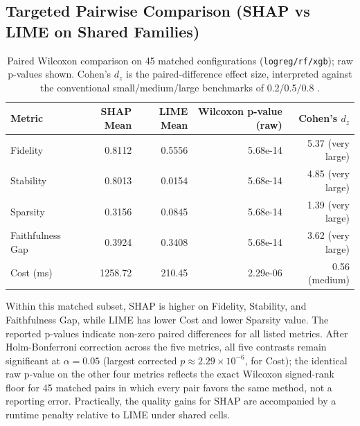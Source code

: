 \documentclass[twoside,11pt]{article}
\begin{document}
\subsection{Targeted Pairwise Comparison (SHAP vs LIME on Shared Families)}
\begin{table}[h]
\centering
\caption{Paired Wilcoxon comparison on 45 matched configurations
(\texttt{logreg/rf/xgb}); raw p-values shown. Cohen's $d_z$ is the
paired-difference effect size, interpreted against the conventional
small/medium/large benchmarks of 0.2/0.5/0.8 \citep{cohen1988statistical}.}
\begin{tabular}{lrrrr}
\toprule
Metric & SHAP Mean & LIME Mean & Wilcoxon p-value (raw) & Cohen's $d_z$ \\
\midrule
Fidelity         & 0.8112 & 0.5556 & 5.68e-14 & 5.37 (very large) \\
Stability        & 0.8013 & 0.0154 & 5.68e-14 & 4.85 (very large) \\
Sparsity         & 0.3156 & 0.0845 & 5.68e-14 & 1.39 (very large) \\
Faithfulness Gap & 0.3924 & 0.3408 & 5.68e-14 & 3.62 (very large) \\
Cost (ms)        & 1258.72 & 210.45 & 2.29e-06 & 0.56 (medium) \\
\bottomrule
\end{tabular}
\label{tab:shap-lime}
\end{table}

Within this matched subset, SHAP is higher on Fidelity, Stability, and
Faithfulness Gap, while LIME has lower Cost and lower Sparsity value. The
reported p-values indicate non-zero paired differences for all listed metrics.
After Holm-Bonferroni correction across the five metrics, all five contrasts
remain significant at $\alpha=0.05$ (largest corrected $p\approx 2.29\times10^{-6}$,
for Cost); the identical raw p-value on the other four metrics reflects the
exact Wilcoxon signed-rank floor for 45 matched pairs in which every pair
favors the same method, not a reporting error. Practically, the quality gains
for SHAP are accompanied by a runtime penalty relative to LIME under shared
cells.
\end{document}
